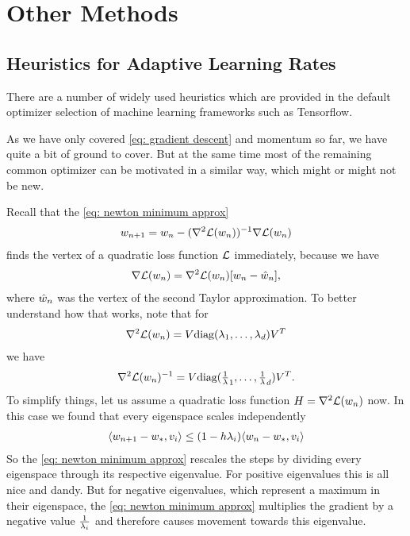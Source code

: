 \chapter{Other Methods}


\section{Heuristics for Adaptive Learning Rates}
\label{sec: heuristics for adpative learning rates}

There are a number of widely used heuristics which are provided in the
default optimizer selection of machine learning frameworks such as Tensorflow.

As we have only covered \ref{eq: gradient descent} and momentum so far, we have
quite a bit of ground to cover. But at the same time most of the remaining
common optimizer \parencite[as reviewed by e.g.][]{ruderOverviewGradientDescent2017}
can be motivated in a similar way, which might or might not be new.

Recall that the \ref{eq: newton minimum approx}
\begin{align*}
	w_{n+1}	= w_n - (\nabla^2\mathcal{L}(w_n))^{-1}\nabla\mathcal{L}(w_n)
\end{align*}
finds the vertex of a quadratic loss function \(\mathcal{L}\) immediately, because we
have
\begin{align*}
	\nabla\mathcal{L}(w_n) = \nabla^2\mathcal{L}(w_n)[w_n - \hat{w}_n],
\end{align*}
where \(\hat{w}_n\) was the vertex of the second Taylor approximation.
To better understand how that works, note that for
\begin{align*}
	\nabla^2\mathcal{L}(w_n) = V \text{diag}(\lambda_1,\dots,\lambda_d)V^T
\end{align*}
we have
\begin{align*}
	\nabla^2\mathcal{L}(w_n)^{-1}
	= V \text{diag}(\tfrac1{\lambda}_1,\dots,\tfrac1{\lambda}_d)V^T.
\end{align*}
To simplify things, let us assume a quadratic loss function
\(H=\nabla^2\mathcal{L}(w_n)\) now.  In this case we found that every
eigenspace scales independently
\begin{align*}
	\langle w_{n+1} - w_*, v_i \rangle
	\le (1-h \lambda_i)\langle w_n - w_*, v_i \rangle
\end{align*}
So the \ref{eq: newton minimum approx} rescales the steps by dividing every
eigenspace through its respective eigenvalue. For positive eigenvalues this is
all nice and dandy. But for negative eigenvalues, which represent a maximum in
their eigenspace, the \ref{eq: newton minimum approx} multiplies the gradient by
a negative value \(\tfrac1{\lambda_i}\) and therefore causes movement towards
this eigenvalue.

